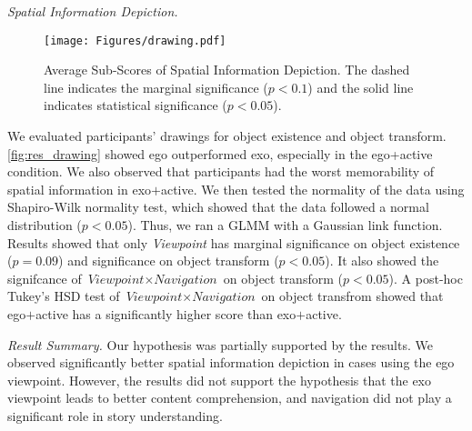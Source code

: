 \textit{Spatial Information Depiction.}
\begin{figure*}[h]
\centering
  \texttt{[image: Figures/drawing.pdf]}
  \caption{Average Sub-Scores of Spatial Information Depiction. The dashed line indicates the marginal significance ($p < 0.1$) and the solid line indicates statistical significance ($p < 0.05$).}
  \label{fig:res_drawing}
\end{figure*}
We evaluated participants' drawings for object existence and object transform.
\autoref{fig:res_drawing} showed ego outperformed exo, especially in the ego+active condition.
We also observed that participants had the worst memorability of spatial information in exo$+$active.
We then tested the normality of the data using Shapiro-Wilk normality test, which showed that the data followed a normal distribution ($p < 0.05$).
Thus, we ran a GLMM with a Gaussian link function.
Results showed that only \textit{Viewpoint} has marginal significance on object existence ($p = 0.09$) and significance on object transform ($p < 0.05$). It also showed the signifcance of $\textit{Viewpoint}\times\textit{Navigation}$ on object transform ($p < 0.05$).
A post-hoc Tukey's HSD test of $\textit{Viewpoint}\times\textit{Navigation}$ on object transfrom showed that ego$+$active has a significantly higher score than exo$+$active.

{\textit{Result Summary.} Our hypothesis was partially supported by the results. We observed significantly better spatial information depiction in cases using the ego viewpoint. However, the results did not support the hypothesis that the exo viewpoint leads to better content comprehension, and navigation did not play a significant role in story understanding.}


